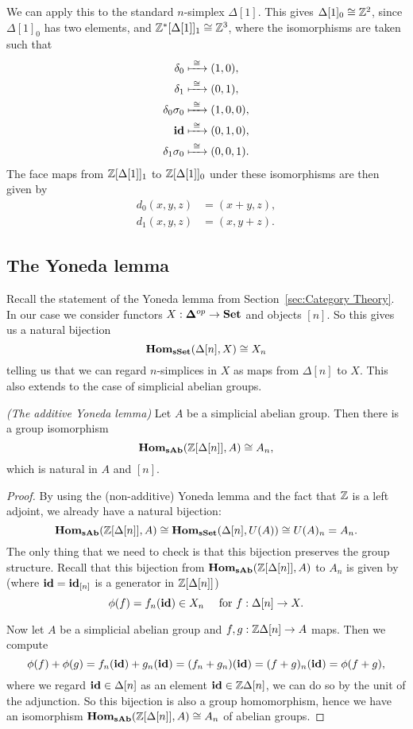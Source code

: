 \begin{example}
	We can apply this to the standard $n$-simplex $\Delta[1]$. This gives $\Delta[1]_0 \cong \mathbb{Z}^2$, since $\Delta[1]_0$ has two elements, and $\mathbb{Z}^\ast[\Delta[1]]_1 \cong \mathbb{Z}^3$, where the isomorphisms are taken such that
	\begin{align*}
		\delta_0         &\xmapsto{\,\,{\cong}\,\,} (1, 0), \\
		\delta_1         &\xmapsto{\,\,{\cong}\,\,} (0, 1), \\
		\delta_0\sigma_0 &\xmapsto{\,\,{\cong}\,\,} (1, 0, 0), \\
		\mathbf{id}              &\xmapsto{\,\,{\cong}\,\,} (0, 1, 0), \\
		\delta_1\sigma_0 &\xmapsto{\,\,{\cong}\,\,} (0, 0, 1).
	\end{align*}
	The face maps from $\mathbb{Z}[\Delta[1]]_1$ to $\mathbb{Z}[\Delta[1]]_0$ under these isomorphisms are then given by
	\begin{align*}
		d_0(x, y, z) &= (x+y, z), \\
		d_1(x, y, z) &= (x, y+z).
	\end{align*}
\end{example}

\subsection{The Yoneda lemma}
Recall the statement of the Yoneda lemma from Section~\ref{sec:Category Theory}. In our case we consider functors $X: \mathbf{\Delta}^{op} \to \mathbf{Set}$ and objects $[n]$. So this gives us a natural bijection
$$ \mathbf{Hom}_{\mathbf{sSet}}(\Delta[n], X) \cong X_n $$
telling us that we can regard $n$-simplices in $X$ as maps from $\Delta[n]$ to $X$. This also extends to the case of simplicial abelian groups.
\begin{lemma}\emph{(The additive Yoneda lemma)}
	\label{le:yoneda_add}
	Let $A$ be a simplicial abelian group. Then there is a group isomorphism
	$$ \mathbf{Hom}_{\mathbf{sAb}}(\mathbb{Z}[\Delta[n]], A) \cong A_n, $$
	which is natural in $A$ and $[n]$.
\end{lemma}
\begin{proof}
	By using the (non-additive) Yoneda lemma and the fact that $\mathbb{Z}$ is a left adjoint, we already have a natural bijection:
	$$ \mathbf{Hom}_{\mathbf{sAb}}(\mathbb{Z}[\Delta[n]], A) \cong \mathbf{Hom}_{\mathbf{sSet}}(\Delta[n], U(A)) \cong U(A)_n = A_n. $$
	The only thing that we need to check is that this bijection preserves the group structure. Recall that this bijection from $\mathbf{Hom}_{\mathbf{sAb}}(\mathbb{Z}[\Delta[n]], A)$ to $A_n$ is given by (where $\mathbf{id} = \mathbf{id}_{[n]}$ is a generator in $\mathbb{Z}[\Delta[n]]$)
	$$ \phi(f) = f_n(\mathbf{id}) \in X_n \quad\text{ for } f: \Delta[n] \to X. $$

	Now let $A$ be a simplicial abelian group and $f, g: \mathbb{Z}\Delta[n] \to A$ maps. Then we compute
	$$ \phi(f) + \phi(g) = f_n(\mathbf{id}) + g_n(\mathbf{id}) = (f_n + g_n)(\mathbf{id}) = (f+g)_n(\mathbf{id}) = \phi(f+g), $$
	where we regard $\mathbf{id} \in \Delta[n]$ as an element $\mathbf{id} \in \mathbb{Z}\Delta[n]$, we can do so by the unit of the adjunction. So this bijection is also a group homomorphism, hence we have an isomorphism $\mathbf{Hom}_{\mathbf{sAb}}(\mathbb{Z}[\Delta[n]], A) \cong A_n$ of abelian groups.
\end{proof}
